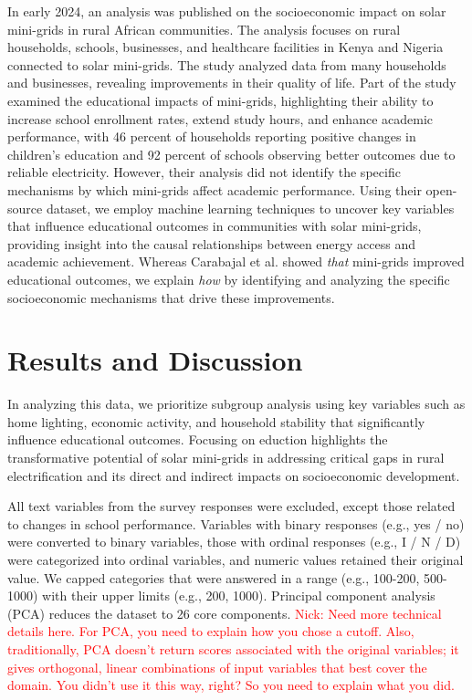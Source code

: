 \documentclass[journal=jacsat,manuscript=article]{achemso}
\begin{document}
In early 2024, an analysis was published on the socioeconomic impact on solar mini-grids in rural African communities. The analysis focuses on rural households, schools, businesses, and healthcare facilities in Kenya and Nigeria connected to solar mini-grids.\cite{Carabajal2024} The study analyzed data from many households and businesses, revealing improvements in their quality of life. Part of the study examined the educational impacts of mini-grids, highlighting their ability to increase school enrollment rates, extend study hours, and enhance academic performance, with 46 percent of households reporting positive changes in children's education and 92 percent of schools observing better outcomes due to reliable electricity. However, their analysis did not identify the specific mechanisms by which mini-grids affect academic performance. Using their open-source dataset, we employ machine learning techniques to uncover key variables that influence educational outcomes in communities with solar mini-grids, providing insight into the causal relationships between energy access and academic achievement. Whereas Carabajal et al. showed \textit{that} mini-grids improved educational outcomes, we explain \textit{how} by identifying and analyzing the specific socioeconomic mechanisms that drive these improvements.

\section{Results and Discussion}
In analyzing this data, we prioritize subgroup analysis using key variables such as home lighting, economic activity, and household stability that significantly influence educational outcomes. Focusing on eduction highlights the transformative potential of solar mini-grids in addressing critical gaps in rural electrification and its direct and indirect impacts on socioeconomic development.

All text variables from the survey responses were excluded, except those related to changes in school performance. Variables with binary responses (e.g., yes / no) were converted to binary variables, those with ordinal responses (e.g., I / N / D) were categorized into ordinal variables, and numeric values retained their original value. We capped categories that were answered in a range (e.g., 100-200, 500-1000) with their upper limits (e.g., 200, 1000). Principal component analysis (PCA) reduces the dataset to 26 core components. \textcolor{red}{Nick: Need more technical details here. For PCA, you need to explain how you chose a cutoff. Also, traditionally, PCA doesn't return scores associated with the original variables; it gives orthogonal, linear combinations of input variables that best cover the domain. You didn't use it this way, right? So you need to explain what you did.}
\end{document}
